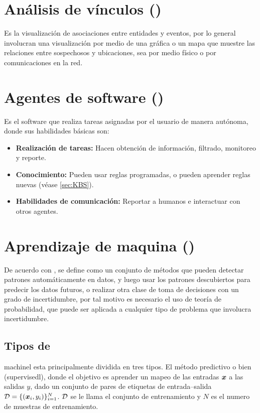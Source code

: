 
\section{Análisis de vínculos ()}
Es la visualización de asociaciones entre entidades y eventos, por lo general involucran una visualización por medio de una gráfica o un mapa que muestre las relaciones entre sospechosos y ubicaciones, sea por medio físico o por comunicaciones en la red.


\section{Agentes de software ()}
Es el software que realiza tareas asignadas por el usuario de manera autónoma, donde sus habilidades básicas son:
\begin{itemize}
\item \textbf{Realización de tareas:} Hacen obtención de información, filtrado, monitoreo y reporte.
\item \textbf{Conocimiento:} Pueden usar reglas programadas, o pueden aprender reglas nuevas (véase \ref{sec:KBS}).
\item \textbf{Habilidades de comunicación:} Reportar a humanos e interactuar con otros agentes.
\end{itemize}


\section{Aprendizaje de maquina ()} \label{sec:ML}
De acuerdo con \cite{murphymachinel}, se define como un conjunto de métodos que pueden detectar patrones automáticamente en datos, y luego usar los patrones descubiertos para predecir los datos futuros, o realizar otra clase de toma de decisiones con un grado de incertidumbre, por tal motivo es necesario el uso de teoría de probabilidad, que puede ser aplicada a cualquier tipo de problema que involucra incertidumbre.

\subsection{Tipos de }
\gls{machinel} esta principalmente dividida en tres tipos. El método predictivo o bien  (\gls{supervisedl}), donde el objetivo es aprender un mapeo de las entradas ${\bm{x}}$ a las salidas $y$, dado un conjunto de pares de etiquetas de entrada--salida $\mathcal{D} = \{({\bm{x}}_i, y_i)\}_{i=1}^{N}$. $\mathcal{D}$ se le llama el conjunto de entrenamiento y $N$ es el numero de muestras de entrenamiento.

